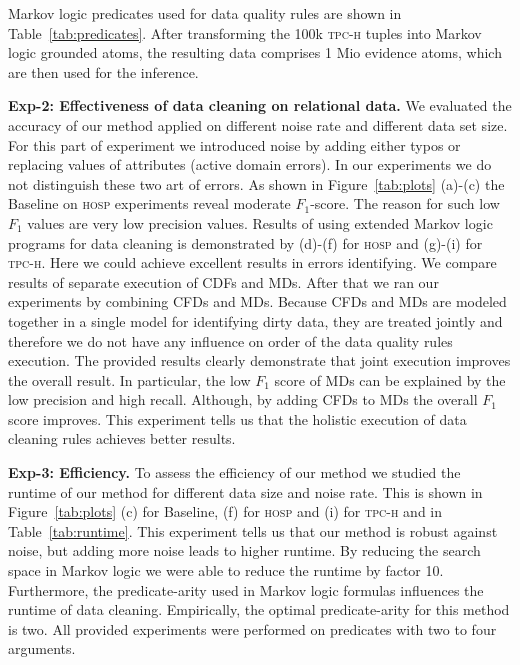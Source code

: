 
Markov logic predicates used for data quality rules are shown in Table~\ref{tab:predicates}. After transforming the 100k \textsc{tpc-h} tuples into Markov logic grounded atoms, the resulting data comprises 1 Mio evidence atoms, which are then used for the inference.

\textbf{Exp-2: Effectiveness of data cleaning on relational data.} We evaluated the accuracy of our method applied on different noise rate and different data set size. For this part of experiment we introduced noise by adding either typos or replacing values of attributes (active domain errors). In our experiments we do not distinguish these two art of errors. As shown in Figure~\ref{tab:plots} (a)-(c) the Baseline on \textsc{hosp} experiments reveal moderate $F_1$-score. The reason for such low $F_1$ values are very low precision values. Results of using extended Markov logic programs for data cleaning is demonstrated by (d)-(f) for \textsc{hosp} and (g)-(i) for \textsc{tpc-h}. Here we could achieve excellent results in errors identifying. We compare results of separate execution of CDFs and MDs. After that we ran our experiments by combining CFDs and MDs. Because CFDs and MDs are modeled together in a single model for identifying dirty data, they are treated jointly and therefore we do not have any influence on order of the data quality rules execution. The provided results clearly demonstrate that joint execution improves the overall result. In particular, the low $F_1$ score of MDs can be explained by the low precision and high recall. Although, by adding CFDs to MDs the overall $F_1$ score improves. This experiment tells us that the holistic execution of data cleaning rules achieves better results. 

\textbf{Exp-3: Efficiency.} To assess the efficiency of our method we studied the runtime of our method for different data size and noise rate. This is shown in Figure~\ref{tab:plots} (c) for Baseline, (f) for \textsc{hosp} and (i) for \textsc{tpc-h} and in Table~\ref{tab:runtime}. This experiment tells us that our method is robust against noise, but adding more noise leads to higher runtime. By reducing the search space in Markov logic we were able to reduce the runtime by factor 10. Furthermore, the predicate-arity used in Markov logic formulas influences the runtime of data cleaning. Empirically, the optimal predicate-arity for this method is two. All provided experiments were performed on predicates with two to four arguments. 

